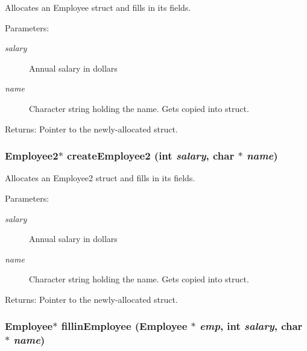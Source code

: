 Allocates an Employee struct and fills in its fields. \begin{Desc}
\item[Parameters:]
\begin{description}
\item[{\em salary}]Annual salary in dollars \item[{\em name}]Character string holding the name. Gets copied into struct. \end{description}
\end{Desc}
\begin{Desc}
\item[Returns:]Pointer to the newly-allocated struct. \end{Desc}
\subsubsection{\setlength{\rightskip}{0pt plus 5cm}\bf{Employee2}$\ast$ create\-Employee2 (int {\em salary}, char $\ast$ {\em name})}\label{employee_8h_a71e796ab3d70e452c5693e15f7d5f8a}


Allocates an Employee2 struct and fills in its fields. \begin{Desc}
\item[Parameters:]
\begin{description}
\item[{\em salary}]Annual salary in dollars \item[{\em name}]Character string holding the name. Gets copied into struct. \end{description}
\end{Desc}
\begin{Desc}
\item[Returns:]Pointer to the newly-allocated struct. \end{Desc}
\subsubsection{\setlength{\rightskip}{0pt plus 5cm}\bf{Employee}$\ast$ fillin\-Employee (\bf{Employee} $\ast$ {\em emp}, int {\em salary}, char $\ast$ {\em name})}\label{employee_8h_cff08fb0ab125ccc30b9aa63cef86f36}


